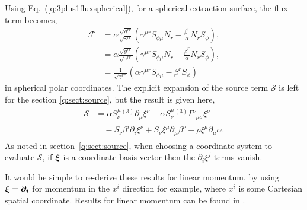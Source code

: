 Using Eq.~(\ref{q:3plus1fluxspherical}), for a spherical extraction surface, the flux term becomes,
\begin{align}
 \mathcal{F} &= \alpha\frac{\sqrt{g^{rr}}}{\sqrt{\gamma^{rr}}} (\gamma^{\mu r} S_{\phi\mu} N_r -\frac{\beta^r}{\alpha}N_r S_\phi), \\ 
 &= \alpha\frac{\sqrt{g^{rr}}}{\sqrt{\gamma^{rr}}} (\gamma^{\mu r} S_{\phi\mu} N_r -\frac{\beta^r}{\alpha}N_r S_\phi), \\ 
  \label{q:final_flux} &= \frac{1}{\sqrt{\gamma^{rr}}}\left(\alpha \gamma^{\mu r}S_{\phi\mu} -\beta^r S_\phi\right)
\end{align} 
in spherical polar coordinates. The explicit expansion of the source term $\mathcal{S}$ is left for the section \ref{q:sect:source}, but the result is given here,
\begin{align}\label{q:s_explicit_angmom} 
\begin{split}\mathcal{S} &= \alpha S^\mu_{\nu}{}^{(3)}\partial_\mu \xi^\nu + \alpha S^\mu_{\nu} {}^{(3)}\Gamma^\nu_{\,\,\,\mu \sigma} \xi^\sigma \\&\quad- S_\nu \beta^i \partial_i \xi^\nu  + S_\nu \xi^\mu \partial_\mu \beta^\nu - \rho \xi^\mu \partial_\mu \alpha.
\end{split}
\end{align}
As noted in section~\ref{q:sect:source}, when choosing a coordinate system to evaluate $\mathcal{S}$, if $\boldsymbol{\xi}$ is a coordinate basis vector then the $\partial_i \xi^j$ terms vanish. 

It would be simple to re-derive these results for linear momentum, by using $\boldsymbol{\xi} = \boldsymbol{\partial_i}$ for momentum in the $x^i$ direction for example, where $x^i$ is some Cartesian spatial coordinate. Results for linear momentum can be found in \cite{Clough_2021}.





